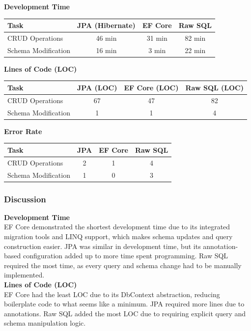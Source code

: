 \newpage
\textbf{Development Time} \\
\begin{tabular}{|l|c|c|c|}
\hline
\textbf{Task} & \textbf{JPA (Hibernate)} & \textbf{EF Core} & \textbf{Raw SQL} \\ \hline
CRUD Operations & 46 min & 31 min & 82 min \\ \hline
Schema Modification & 16 min & 3 min & 22 min \\ \hline
\end{tabular}

\textbf{Lines of Code (LOC)} \\
\begin{tabular}{|l|c|c|c|}
\hline
\textbf{Task} & \textbf{JPA (LOC)} & \textbf{EF Core (LOC)} & \textbf{Raw SQL (LOC)} \\ \hline
CRUD Operations & 67 & 47 & 82 \\ \hline
Schema Modification & 1 & 1 & 4 \\ \hline
\end{tabular}

\textbf{Error Rate} \\
\begin{tabular}{|l|c|c|c|}
\hline
\textbf{Task} & \textbf{JPA} & \textbf{EF Core} & \textbf{Raw SQL} \\ \hline
CRUD Operations & 2 & 1 & 4 \\ \hline
Schema Modification & 1 & 0 & 3 \\ \hline
\end{tabular}

\subsubsection{Discussion}
\textbf{Development Time} \\
EF Core demonstrated the shortest development time due to its integrated migration tools and LINQ support, which makes schema updates and query construction easier. JPA was similar in development time, but its annotation-based configuration added up to more time spent programming. Raw SQL required the most time, as every query and schema change had to be manually implemented.\\

\noindent
\textbf{Lines of Code (LOC)} \\
EF Core had the least LOC due to its DbContext abstraction, reducing boilerplate code to what seems like a minimum. JPA required more lines due to annotations. Raw SQL added the most LOC due to requiring explicit query and schema manipulation logic.\\

